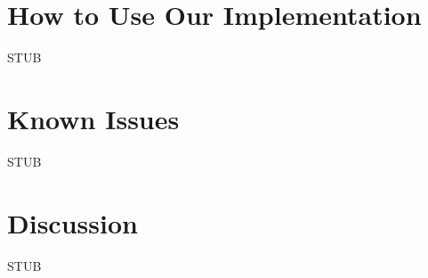 \documentclass[11pt, onecolumn]{article}
\begin{document}
\section{How to Use Our Implementation}

STUB


\section{Known Issues}

STUB


\section{Discussion}

STUB
\end{document}
